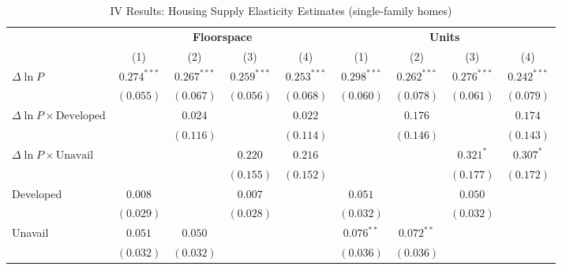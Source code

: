 
\begin{table}
\caption{IV Results: Housing Supply Elasticity Estimates (single-family homes)}
\begin{center}
\begin{footnotesize}
\begin{threeparttable}
\begin{tabular}{l@{} c@{} c@{} c@{} c@{} c@{} c@{} c@{} c@{}}
\toprule
 & \multicolumn{4}{c}{\textbf{Floorspace}} & \multicolumn{4}{c}{\textbf{Units}} \\
\cmidrule(lr){2-5} \cmidrule(lr){6-9}
 & (1) & (2) & (3) & (4) & (1) & (2) & (3) & (4) \\
\midrule
$\Delta\ln P$                         & $0.274^{***}$ & $0.267^{***}$ & $0.259^{***}$ & $0.253^{***}$ & $0.298^{***}$ & $0.262^{***}$ & $0.276^{***}$ & $0.242^{***}$ \\
                                      & $(0.055)$     & $(0.067)$     & $(0.056)$     & $(0.068)$     & $(0.060)$     & $(0.078)$     & $(0.061)$     & $(0.079)$     \\
$\Delta\ln P\times{\text{Developed}}$ &               & $0.024$       &               & $0.022$       &               & $0.176$       &               & $0.174$       \\
                                      &               & $(0.116)$     &               & $(0.114)$     &               & $(0.146)$     &               & $(0.143)$     \\
$\Delta\ln P\times{\text{Unavail}}$   &               &               & $0.220$       & $0.216$       &               &               & $0.321^{*}$   & $0.307^{*}$   \\
                                      &               &               & $(0.155)$     & $(0.152)$     &               &               & $(0.177)$     & $(0.172)$     \\
Developed                             & $0.008$       &               & $0.007$       &               & $0.051$       &               & $0.050$       &               \\
                                      & $(0.029)$     &               & $(0.028)$     &               & $(0.032)$     &               & $(0.032)$     &               \\
Unavail                               & $0.051$       & $0.050$       &               &               & $0.076^{**}$  & $0.072^{**}$  &               &               \\
                                      & $(0.032)$     & $(0.032)$     &               &               & $(0.036)$     & $(0.036)$     &               &               \\

\end{tabular}
\end{threeparttable}
\end{footnotesize}
\end{center}
\end{table}

